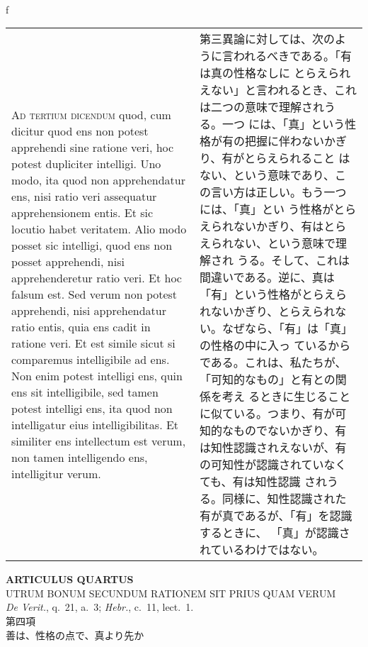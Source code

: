 \\f\documentclass[10pt]{jsarticle} %
\begin{document}
\begin{longtable}{p{21em}p{21em}}
{\scshape Ad tertium dicendum} quod, cum dicitur quod ens non potest
apprehendi sine ratione veri, hoc potest dupliciter intelligi. Uno
modo, ita quod non apprehendatur ens, nisi ratio veri assequatur
apprehensionem entis. Et sic locutio habet veritatem. Alio modo posset
sic intelligi, quod ens non posset apprehendi, nisi apprehenderetur
ratio veri. Et hoc falsum est. Sed verum non potest apprehendi, nisi
apprehendatur ratio entis, quia ens cadit in ratione veri. Et est
simile sicut si comparemus intelligibile ad ens. Non enim potest
intelligi ens, quin ens sit intelligibile, sed tamen potest intelligi
ens, ita quod non intelligatur eius intelligibilitas. Et similiter ens
intellectum est verum, non tamen intelligendo ens, intelligitur verum.


&

第三異論に対しては、次のように言われるべきである。「有は真の性格なしに
とらえられえない」と言われるとき、これは二つの意味で理解されうる。一つ
には、「真」という性格が有の把握に伴わないかぎり、有がとらえられること
はない、という意味であり、この言い方は正しい。もう一つには、「真」とい
う性格がとらえられないかぎり、有はとらえられない、という意味で理解され
うる。そして、これは間違いである。逆に、真は「有」という性格がとらえら
れないかぎり、とらえられない。なぜなら、「有」は「真」の性格の中に入っ
ているからである。これは、私たちが、「可知的なもの」と有との関係を考え
るときに生じることに似ている。つまり、有が可知的なものでないかぎり、有
は知性認識されえないが、有の可知性が認識されていなくても、有は知性認識
されうる。同様に、知性認識された有が真であるが、「有」を認識するときに、
「真」が認識されているわけではない。

\end{longtable}
\newpage


\begin{center}
 {\Large {\bf ARTICULUS QUARTUS}}\\
 {\large UTRUM BONUM SECUNDUM RATIONEM SIT PRIUS QUAM VERUM}\\
 {\footnotesize {\itshape De Verit.}, q.~21, a.~3; {\itshape Hebr.},
 c.~11, lect.~1.}\\
 {\Large 第四項\\善は、性格の点で、真より先か}
\end{center}
\end{document}
